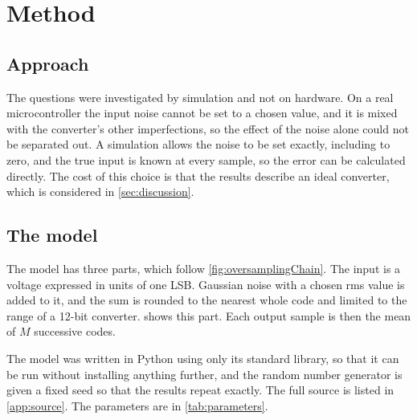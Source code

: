 
\section{Method}
\label{sec:method}

\subsection{Approach}

The questions were investigated by simulation and not on hardware. On a real
microcontroller the input noise cannot be set to a chosen value, and it is
mixed with the converter's other imperfections, so the effect of the noise
alone could not be separated out. A simulation allows the noise to be set
exactly, including to zero, and the true input is known at every sample, so
the error can be calculated directly. The cost of this choice is that the
results describe an ideal converter, which is considered in
\cref{sec:discussion}.

\subsection{The model}

The model has three parts, which follow \cref{fig:oversamplingChain}. The
input is a voltage expressed in units of one LSB. Gaussian noise with a chosen
rms value is added to it, and the sum is rounded to the nearest whole code and
limited to the range of a 12-bit converter.  shows this
part. Each output sample is then the mean of $M$ successive codes.



The model was written in Python using only its standard library, so that it
can be run without installing anything further, and the random number
generator is given a fixed seed so that the results repeat exactly. The full
source is listed in \cref{app:source}. The parameters are in
\cref{tab:parameters}.

